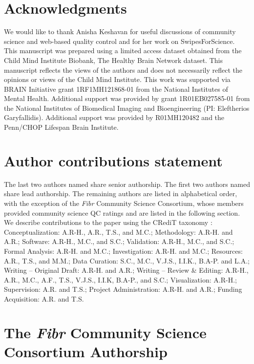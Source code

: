 \documentclass[fleqn,10pt,inline]{wlscirep}
\begin{document}


\section*{Acknowledgments}

We would like to thank Anisha Keshavan for useful discussions of community
science and web-based quality control and for her work on SwipesForScience. This
manuscript was prepared using a limited access dataset obtained from the Child
Mind Institute Biobank, The Healthy Brain Network dataset. This manuscript
reflects the views of the authors and does not necessarily reflect the opinions
or views of the Child Mind Institute. This work was supported via BRAIN Initiative grant 1RF1MH121868-01 from the National Institutes of Mental Health. Additional support was provided by grant 1R01EB027585-01 from the National Institutes of Biomedical Imaging and Bioengineering (PI: Eleftherios Garyfallidis). Additional support was provided by R01MH120482 and the Penn/CHOP Lifespan Brain Institute. 

\section*{Author contributions statement}

The last two authors named share senior authorship. The first two authors named
share lead authorship. The remaining authors are listed in alphabetical order,
with the exception of the \emph{Fibr} Community Science Consortium, whose members
provided community science QC ratings and are listed in the following section.
We describe contributions to the paper using the CRediT taxonomy \cite{brand2015-vd,allen2014-oc}:
Conceptualization: A.R-H., A.R., T.S., and M.C.;
Methodology: A.R-H. and A.R.;
Software: A.R-H., M.C., and S.C.;
Validation: A.R-H., M.C., and S.C.;
Formal Analysis: A.R-H. and M.C.;
Investigation: A.R-H. and M.C.;
Resources: A.R., T.S., and M.M.;
Data Curation: S.C., M.C., V.J.S., I.I.K., B.A-P. and L.A.;
Writing – Original Draft: A.R-H. and A.R.;
Writing – Review \& Editing: A.R-H., A.R., M.C., A.F., T.S., V.J.S., I.I.K, B.A-P., and S.C.;
Visualization: A.R-H.;
Supervision: A.R. and T.S.;
Project Administration: A.R-H. and A.R.;
Funding Acquisition: A.R. and T.S.

\section*{The \emph{Fibr} Community Science Consortium Authorship
}
\end{document}
